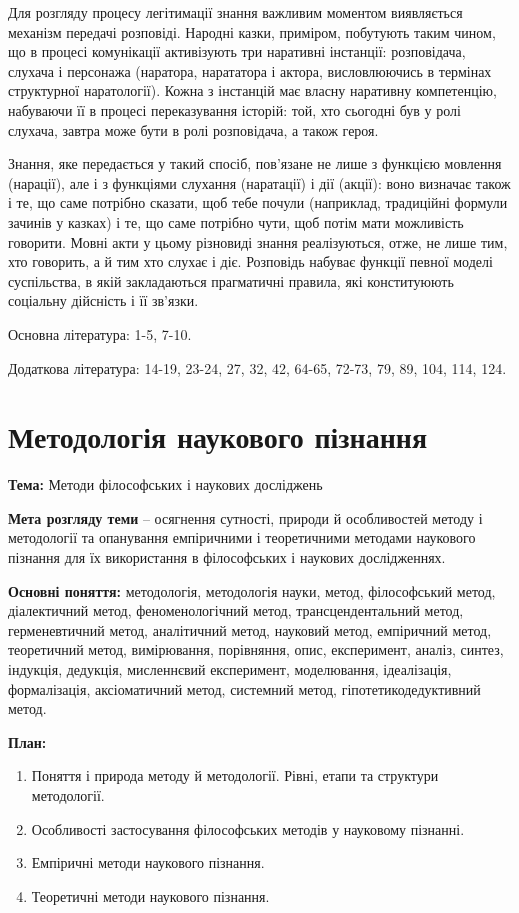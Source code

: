 Для розгляду процесу легітимації знання важливим моментом виявляється
механізм передачі розповіді. Народні казки, приміром, побутують таким чином,
що в процесі комунікації активізують три наративні інстанції: розповідача,
слухача і персонажа (наратора, нарататора і актора, висловлюючись в термінах
структурної наратології). Кожна з інстанцій має власну наративну компетенцію,
набуваючи її в процесі переказування історій: той, хто сьогодні був у ролі
слухача, завтра може бути в ролі розповідача, а також героя.

Знання, яке передається у такий спосіб, пов’язане не лише з функцією
мовлення (нарації), але і з функціями слухання (наратації) і дії (акції): воно
визначає також і те, що саме потрібно сказати, щоб тебе почули (наприклад,
традиційні формули зачинів у казках) і те, що саме потрібно чути, щоб потім
мати можливість говорити. Мовні акти у цьому різновиді знання реалізуються,
отже, не лише тим, хто говорить, а й тим хто слухає і діє. Розповідь набуває
функції певної моделі суспільства, в якій закладаються прагматичні правила,
які конституюють соціальну дійсність і її зв’язки.

Основна література: 1-5, 7-10.

Додаткова література: 14-19, 23-24, 27, 32, 42, 64-65, 72-73, 79, 89, 104,
114, 124.

\section{Методологія наукового пізнання}

\textbf{Тема:} Методи філософських і наукових досліджень

\textbf{Мета розгляду теми} – осягнення сутності, природи й особливостей методу
і методології та опанування емпіричними і теоретичними методами наукового
пізнання для їх використання в філософських і наукових дослідженнях.

\textbf{Основні поняття:} методологія, методологія науки, метод, філософський
метод, діалектичний метод, феноменологічний метод, трансцендентальний
метод, герменевтичний метод, аналітичний метод, науковий метод, емпіричний
метод, теоретичний метод, вимірювання, порівняння, опис, експеримент, аналіз,
синтез, індукція, дедукція, мисленнєвий експеримент, моделювання,
ідеалізація, формалізація, аксіоматичний метод, системний метод, гіпотетикодедуктивний метод.

\textbf{План:}
\begin{enumerate}
	\item Поняття і природа методу й методології. Рівні, етапи та структури методології.
	\item Особливості застосування філософських методів у науковому пізнанні.
	\item Емпіричні методи наукового пізнання.
	\item Теоретичні методи наукового пізнання.
\end{enumerate}

